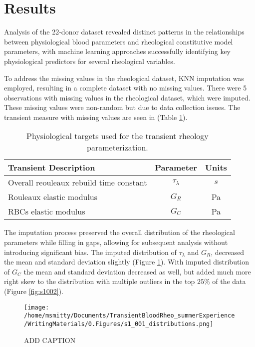 \documentclass[12pt,letterpaper]{article}
\begin{document}
\newpage
\section{Results}
Analysis of the 22-donor dataset revealed distinct patterns in the relationships between physiological blood parameters and rheological constitutive model parameters,
with machine learning approaches successfully identifying key physiological predictors for several rheological variables.

To address the missing values in the rheological dataset, KNN imputation was employed, resulting in a complete dataset with no missing values. There were
5 observations with missing values in the rheological dataset, which were imputed. These missing values were non-random but due to data collection issues.
The transient measure with missing values are seen in (Table \ref{tab:transientRheo}).

\begin{table}[ht]
    \centering
    \caption{Physiological targets used for the transient rheology parameterization.}
    \begin{tabular}{lcc}
        Transient Description                              & Parameter & Units \\
        \hline
        Overall reouleaux rebuild time constant            & $\tau_{\lambda}$  & $s$ \\
        Rouleaux elastic modulus                           & $G_R$  & Pa \\
        RBCs elastic modulus                               & $G_C$ & Pa
    \end{tabular}
    \label{tab:transientRheo}
\end{table}

The imputation process preserved the overall distribution of the rheological parameters while filling in gaps, allowing for subsequent analysis without introducing
significant bias. The imputed distribution of $\tau_{\lambda}$ and $G_R$, decreased the mean and standard deviation slightly (Figure \ref{fig:s1001}). With imputed distribution of $G_C$ the mean
and standard deviation decreased as well, but added much more right skew to the distribution with multiple outliers in the top $25\%$ of the data (Figure \ref{fig:s1002}).

\begin{figure}[ht]
    \centering
    \texttt{[image: /home/msmitty/Documents/TransientBloodRheo\_summerExperience/WritingMaterials/0.Figures/s1\_001\_distributions.png]}
    \caption{ADD CAPTION}
    \label{fig:s1001}
\end{figure}
\end{document}
